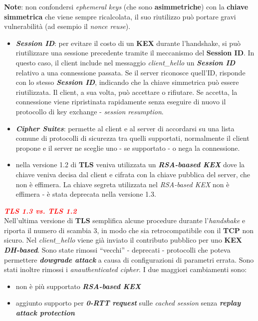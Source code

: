 \begin{flushleft}
    \textbf{Note}: non confondersi \textit{ephemeral keys} (che sono \textbf{asimmetriche}) con la \textbf{chiave simmetrica} che viene sempre ricalcolata, il suo riutilizzo può portare gravi vulnerabilità (ad esempio il \textit{nonce reuse}).
    \begin{itemize}[nosep]
        \item \textbf{\textit{Session ID}}: per evitare il costo di un \textbf{KEX} durante l'handshake, si può riutilizzare una sessione precedente tramite il meccanismo del \textbf{Session ID}. In questo caso, il client include nel messaggio \textit{client\_hello} un \textbf{\textit{Session ID}} relativo a una connessione passata. Se il server riconosce quell'ID, risponde con lo stesso \textbf{\textit{Session ID}}, indicando che la chiave simmetrica può essere riutilizzata. Il client, a sua volta, può accettare o rifiutare. Se accetta, la connessione viene ripristinata rapidamente senza eseguire di nuovo il protocollo di key exchange - \textit{session resumption}.
        \item \textbf{\textit{Cipher Suites}}: permette al client e al server di accordarsi su una lista comune di protocolli di sicurezza tra quelli supportati, normalmente il client propone e il server ne sceglie uno - se supportato - o nega la connessione.
        \item nella versione 1.2 di \textbf{TLS} veniva utilizzata un \textbf{\textit{RSA-baased KEX}} dove la chiave veniva decisa dal client e cifrata con la chiave pubblica del server, che non è effimera. La chiave segreta utilizzata nel \textit{RSA-based KEX} non è effimera - è stata deprecata nella versione 1.3.
    \end{itemize}

    \newpage

    \textcolor{red}{\textbf{\textit{TLS 1.3 vs. TLS 1.2}}} \\
    Nell'ultima versione di \textbf{TLS} semplifica alcune procedure durante l'\textit{handshake} e riporta il numero di scambia 3, in modo che sia retrocompatibile con il \textbf{TCP} non sicuro. Nel \textit{client\_hello} viene già inviato il contributo pubblico per uno \textbf{KEX \textit{DH-based}}. Sono state rimossi ``vecchi'' - deprecati - protocolli che poteva permettere \textbf{\textit{dowgrade attack}} a causa di configurazioni di parametri errata. Sono stati inoltre rimossi i \textit{anauthenticated cipher}. I due maggiori cambiamenti sono:
    \begin{itemize}[nosep]
        \item non è più supportato \textbf{\textit{RSA-based KEX}}
        \item aggiunto supporto per \textbf{\textit{0-RTT request}} sulle \textit{cached session} senza \textbf{\textit{replay attack protection}}
    \end{itemize}


\end{flushleft}
